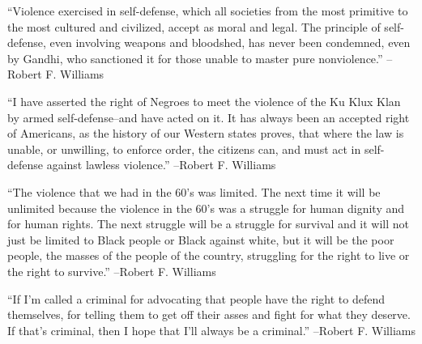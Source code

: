 \documentclass{article}%
\begin{document}
\vspace{1mm}%
\begin{minipage}{\textwidth}%
\flushleft%
“Violence exercised in self{-}defense, which all societies from the most primitive to the most cultured and civilized, accept as moral and legal. The principle of self{-}defense, even involving weapons and bloodshed, has never been condemned, even by Gandhi, who sanctioned it for those unable to master pure nonviolence.”%
\linebreak%
\vspace{1mm}%
–Robert F. Williams%
\linebreak%
\vspace{1mm}%
\end{minipage}%
\linebreak%
\vspace{1mm}%
\begin{minipage}{\textwidth}%
\flushleft%
“I have asserted the right of Negroes to meet the violence of the Ku Klux Klan by armed self{-}defense–and have acted on it. It has always been an accepted right of Americans, as the history of our Western states proves, that where the law is unable, or unwilling, to enforce order, the citizens can, and must act in self{-}defense against lawless violence.”%
\linebreak%
\vspace{1mm}%
–Robert F. Williams%
\linebreak%
\vspace{1mm}%
\end{minipage}%
\linebreak%
\vspace{1mm}%
\begin{minipage}{\textwidth}%
\flushleft%
“The violence that we had in the 60's was limited. The next time it will be unlimited because the violence in the 60's was a struggle for human dignity and for human rights. The next struggle will be a struggle for survival and it will not just be limited to Black people or Black against white, but it will be the poor people, the masses of the people of the country, struggling for the right to live or the right to survive.”%
\linebreak%
\vspace{1mm}%
–Robert F. Williams%
\linebreak%
\vspace{1mm}%
\end{minipage}%
\linebreak%
\vspace{1mm}%
\begin{minipage}{\textwidth}%
\flushleft%
“If I'm called a criminal for advocating that people have the right to defend themselves, for telling them to get off their asses and fight for what they deserve. If that's criminal, then I hope that I'll always be a criminal.”%
\linebreak%
\vspace{1mm}%
–Robert F. Williams%
\linebreak%
\vspace{1mm}%
\end{minipage}%
\end{document}
